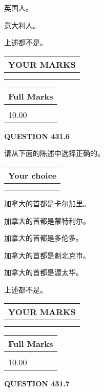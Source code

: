 \documentclass{ctexart}
\begin{document}
 
英国人。
 
 
意大利人。
 
 
 上述都不是。
 
 
  
\vspace{0.2in}
  
\noindent\begin{tabular}{|l|}
\hline
 YOUR MARKS  \\
\hline
 \\ 
 \\ 
\hline
\end{tabular}
\hspace{0.05in} \begin{tabular}{|l|}
\hline
 Full Marks  \\
\hline
 \\ 
10.00 \\
\hline
\end{tabular}
{\textbf{\Large{QUESTION
431.6 
}}}
  
  
请从下面的陈述中选择正确的。
  
  
\noindent\hspace{3.0in} \begin{tabular}{|l|}
\hline
Your choice \\
\hline
 \\ 
 \\ 
\hline
\end{tabular}
  
  
 
 
加拿大的首都是卡尔加里。
 
 
加拿大的首都是蒙特利尔。
 
 
加拿大的首都是多伦多。
 
 
加拿大的首都是魁北克市。
 
 
加拿大的首都是渥太华。
 
 
 上述都不是。
 
 
  
\vspace{0.2in}
  
\noindent\begin{tabular}{|l|}
\hline
 YOUR MARKS  \\
\hline
 \\ 
 \\ 
\hline
\end{tabular}
\hspace{0.05in} \begin{tabular}{|l|}
\hline
 Full Marks  \\
\hline
 \\ 
10.00 \\
\hline
\end{tabular}
{\textbf{\Large{QUESTION
431.7 
}}}
  
\end{document}
